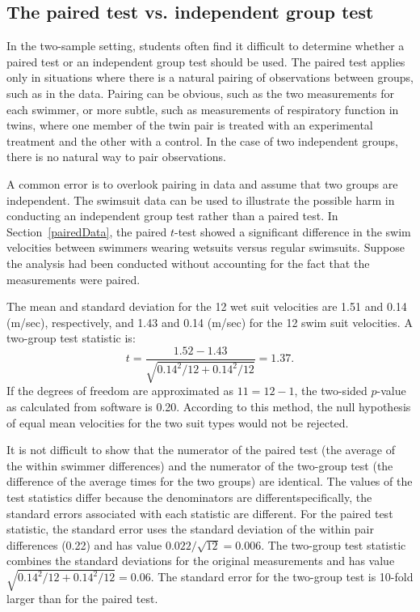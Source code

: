 

\subsection{The paired test vs. independent group test}
\label{pairedVsTwoGroups}

In the two-sample setting, students often find it difficult to determine whether a paired test or an independent group test should be used.  The paired test applies only in situations where there is a natural pairing of observations between groups, such as in the  data. Pairing can be obvious, such as the two measurements for each swimmer, or more subtle, such as measurements of respiratory function in twins, where one member of the twin pair is treated with an experimental treatment and the other with a control. In the case of two independent groups, there is no natural way to pair observations.

A common error is to overlook pairing in data and assume that two groups are independent. The swimsuit data can be used to illustrate the possible harm in conducting an independent group test rather than a paired test. In Section~\ref{pairedData}, the paired $t$-test showed a significant difference in the swim velocities between swimmers wearing wetsuits versus regular swimsuits. Suppose the analysis had been conducted without accounting for the fact that the measurements were paired.

The mean and standard deviation for the 12 wet suit velocities are 1.51 and 0.14 (m/sec), respectively, and 1.43 and 0.14 (m/sec) for the 12 swim suit velocities. A two-group test statistic is:
\[t = \frac{1.52 - 1.43}{\sqrt{0.14^2/12 + 0.14^2/12}} = 1.37. \]
If the degrees of freedom are approximated as $11 = 12 - 1$, the two-sided $p$-value as calculated from software is 0.20. According to this method, the null hypothesis of equal mean velocities for the two suit types would not be rejected.

It is not difficult to show that the numerator of the paired test (the average of the within swimmer differences) and the numerator of the two-group test (the difference of the average times for the two groups) are identical. The values of the test statistics differ because the denominators are different\textemdash specifically, the standard errors associated with each statistic are different.  For the paired test statistic, the standard error uses the standard deviation of the within pair differences (0.22) and has value $0.022/\sqrt{12} = 0.006$. The two-group test statistic combines the standard deviations for the original measurements and has value $\sqrt{0.14^2/12 + 0.14^2/12} = 0.06$.  The standard error for the two-group test is 10-fold larger than for the paired test.  

